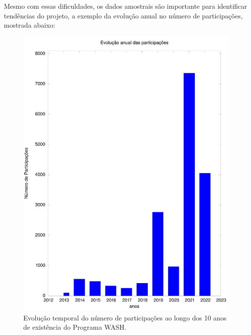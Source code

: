 \documentclass[
12pt,		%
openright,	%
twoside,  %
a4paper,			%
chapter=TITLE,		%
english,			%
french,				%
spanish,			%
brazil				%
]{USPSC-classe/USPSC}
\begin{document}
Mesmo com essas dificuldades, os dados amostrais s\~ao importante para identificar tend\^encias do projeto, a exemplo da evolu\c{c}\~ao anual no n\'umero de participa\c{c}\~oes, mostrada abaixo:











\captionsetup{format=plain}
\begin{figure}[max size={\textwidth}{\textheight}]

\centering


\begin{minipage}[b]{0.4\linewidth}
        \centering
                \includegraphics[width=1.0\linewidth]{../../imagens/output-participantes.jpeg}
                \caption{Evolu\c{c}\~ao temporal do n\'umero de participa\c{c}\~oes ao longo dos 10 anos de exist\^encia do Programa WASH.}
                \label{19699bcc5ab8317274249d6743d62534dbfb95fa}

\end{minipage}
\end{figure}
\end{document}
